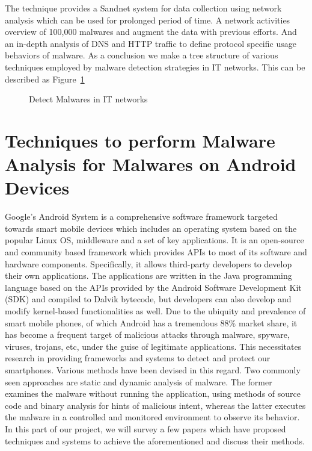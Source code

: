 \documentclass[11pt]{article}
\begin{document}
	The technique provides a Sandnet system for data collection using network analysis which can be used for prolonged period of time. A network activities overview of 100,000 malwares and augment the data with previous efforts. And an in-depth analysis of DNS and HTTP traffic to define protocol specific usage behaviors of malware. 
	As a conclusion we make a tree structure of various techniques employed by malware detection strategies in IT networks. This can be described as Figure~\ref{Networks}\\
	\begin{figure}[h]
		\centering
		\caption{Detect Malwares in IT networks}\label{Networks}
	\end{figure}
	
	\section{Techniques to perform Malware Analysis for Malwares on Android Devices}
	Google’s Android System is a comprehensive software framework targeted towards smart mobile devices which includes an operating system based on the popular Linux OS, middleware and a set of key applications. It is an open-source and community based framework which provides APIs to most of its software and hardware components. Specifically, it allows third-party developers to develop their own applications. The applications are written in the Java programming language based on the APIs provided by the Android Software Development Kit (SDK) and compiled to Dalvik bytecode, but developers can also develop and modify kernel-based functionalities as well.
	Due to the ubiquity and prevalence of smart mobile phones, of which Android has a tremendous 88\% market share, it has become a frequent target of malicious attacks through malware, spyware, viruses, trojans, etc, under the guise of legitimate applications. This necessitates research in providing frameworks and systems to detect and protect our smartphones.
	Various methods have been devised in this regard. Two commonly seen approaches are static and dynamic analysis of malware. The former examines the malware without running the application, using methods of source code and binary analysis for hints of malicious intent, whereas the latter executes the malware in a controlled and monitored environment to observe its behavior. In this part of our project, we will survey a few papers which have proposed techniques and systems to achieve the aforementioned and discuss their methods. 
	
\end{document}
